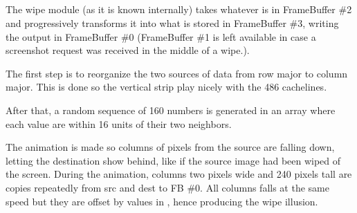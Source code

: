 \par
{}\\
\\
\\
\\

\par
The wipe module (as it is known internally) takes whatever is in FrameBuffer \#2 and progressively transforms it into what is stored in FrameBuffer \#3, writing the output in FrameBuffer \#0 (FrameBuffer \#1 is left available in case a screenshot request was received in the middle of a wipe.).\\
\par
The first step is to reorganize the two sources of data from row major to column major. This is done so the vertical strip play nicely with the 486 cachelines.\\
\par
{}
\par
After that, a random sequence of 160 numbers is generated in an array  where each value are within 16 units of their two neighbors.\\
\par The animation is made so columns of pixels from the source are falling down, letting the destination show behind, like if the source image had been wiped of the screen. During the animation, columns two pixels wide and 240 pixels tall are copies repeatedly from src and dest to FB \#0. All columns falls at the same speed but they are offset by values in , hence producing the wipe illusion.\\



